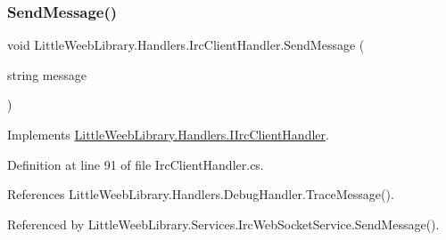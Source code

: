 \subsubsection{\texorpdfstring{Send\+Message()}{SendMessage()}}
{\footnotesize\ttfamily void Little\+Weeb\+Library.\+Handlers.\+Irc\+Client\+Handler.\+Send\+Message (\begin{DoxyParamCaption}\item[{string}]{message }\end{DoxyParamCaption})}



Implements \mbox{\hyperlink{interface_little_weeb_library_1_1_handlers_1_1_i_irc_client_handler_aa9da8681f056b8122ad56c586a78fed0}{Little\+Weeb\+Library.\+Handlers.\+I\+Irc\+Client\+Handler}}.



Definition at line 91 of file Irc\+Client\+Handler.\+cs.



References Little\+Weeb\+Library.\+Handlers.\+Debug\+Handler.\+Trace\+Message().



Referenced by Little\+Weeb\+Library.\+Services.\+Irc\+Web\+Socket\+Service.\+Send\+Message().


